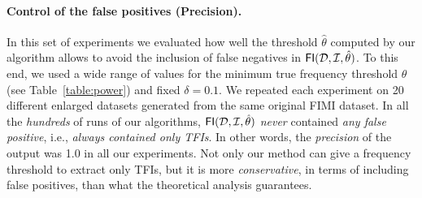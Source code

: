 \paragraph*{Control of the false positives (Precision).}\label{sec:fwer}
In this set of experiments we evaluated how well the threshold $\hat\theta$
computed by our algorithm allows to avoid the inclusion of false negatives in
$\mathsf{FI}({\cal D},{\cal I},\hat\theta)$. %
To this end, we used a wide range of values for the minimum true frequency
threshold $\theta$ (see Table~\ref{table:power}) and fixed $\delta=0.1$. We
repeated each experiment on 20 different enlarged datasets generated from the
same original FIMI dataset. %
In all the \emph{hundreds} of runs of our algorithms, %
$\mathsf{FI}({\cal D},{\cal I},\hat\theta)$ \emph{never} contained \emph{any false
positive}, i.e., \emph{always contained only TFIs}. In other words, the
\emph{precision} of the output was 1.0 in all our experiments. Not %
only our
method can give a frequency threshold to extract only TFIs, but %
it is more
\emph{conservative}, in terms of including false positives, than what the
theoretical analysis guarantees. %

